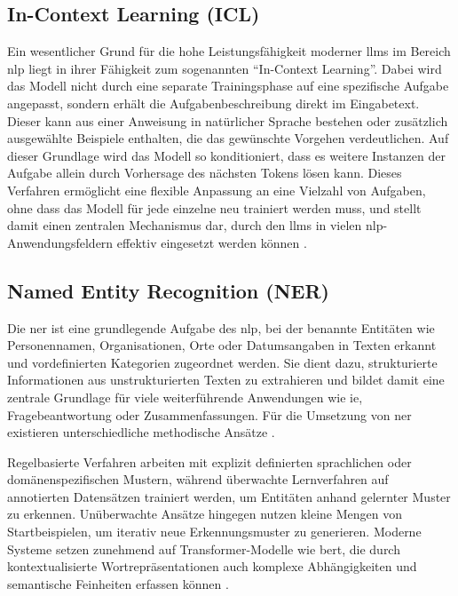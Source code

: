 
\subsection{In-Context Learning (ICL)}\label{subsec:in-context-learning}

Ein wesentlicher Grund für die hohe Leistungsfähigkeit moderner \glspl{llm} im Bereich \gls{nlp} liegt in ihrer Fähigkeit zum sogenannten \enquote{In-Context Learning}.
Dabei wird das Modell nicht durch eine separate Trainingsphase auf eine spezifische Aufgabe angepasst, sondern erhält die Aufgabenbeschreibung direkt im Eingabetext.
Dieser kann aus einer Anweisung in natürlicher Sprache bestehen oder zusätzlich ausgewählte Beispiele enthalten, die das gewünschte Vorgehen verdeutlichen.
Auf dieser Grundlage wird das Modell so konditioniert, dass es weitere Instanzen der Aufgabe allein durch Vorhersage des nächsten Tokens lösen kann.
Dieses Verfahren ermöglicht eine flexible Anpassung an eine Vielzahl von Aufgaben, ohne dass das Modell für jede einzelne neu trainiert werden muss, und stellt damit einen zentralen Mechanismus dar, durch den \glspl{llm} in vielen \gls{nlp}-Anwendungsfeldern effektiv eingesetzt werden können \autocite{brown_language_2020}.


\subsection{Named Entity Recognition (NER)}

Die \gls{ner} ist eine grundlegende Aufgabe des \gls{nlp}, bei der benannte Entitäten wie Personennamen, Organisationen, Orte oder Datumsangaben in Texten erkannt und vordefinierten Kategorien zugeordnet werden.
Sie dient dazu, strukturierte Informationen aus unstrukturierten Texten zu extrahieren und bildet damit eine zentrale Grundlage für viele weiterführende Anwendungen wie \gls{ie}, Fragebeantwortung oder Zusammenfassungen.
Für die Umsetzung von \gls{ner} existieren unterschiedliche methodische Ansätze \autocite{pakhale_comprehensive_2023}.

Regelbasierte Verfahren arbeiten mit explizit definierten sprachlichen oder domänenspezifischen Mustern, während überwachte Lernverfahren auf annotierten Datensätzen trainiert werden, um Entitäten anhand gelernter Muster zu erkennen.
Unüberwachte Ansätze hingegen nutzen kleine Mengen von Startbeispielen, um iterativ neue Erkennungsmuster zu generieren.
Moderne Systeme setzen zunehmend auf Transformer-Modelle wie \gls{bert}, die durch kontextualisierte Wortrepräsentationen auch komplexe Abhängigkeiten und semantische Feinheiten erfassen können \autocite{pakhale_comprehensive_2023}.

